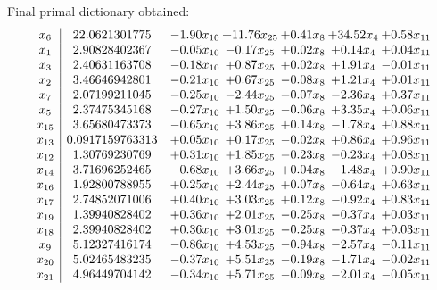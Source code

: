 \documentclass[8pt]{article}
\begin{document}
 Final primal dictionary obtained: 
\[\begin{array}{c| c c@{\hskip 2pt} c@{\hskip 2pt} c@{\hskip 2pt} c@{\hskip 2pt} c@{\hskip 2pt} }
 x_{6}   &  22.0621301775 & -1.90 x_{10} & + 11.76 x_{25} & +  0.41 x_{8} & + 34.52 x_{4} & +  0.58 x_{11}\\
 x_{1}   &  2.90828402367 & -0.05 x_{10} & -0.17 x_{25} & +  0.02 x_{8} & +  0.14 x_{4} & +  0.04 x_{11}\\
 x_{3}   &  2.40631163708 & -0.18 x_{10} & +  0.87 x_{25} & +  0.02 x_{8} & +  1.91 x_{4} & -0.01 x_{11}\\
 x_{2}   &  3.46646942801 & -0.21 x_{10} & +  0.67 x_{25} & -0.08 x_{8} & +  1.21 x_{4} & +  0.01 x_{11}\\
 x_{7}   &  2.07199211045 & -0.25 x_{10} & -2.44 x_{25} & -0.07 x_{8} & -2.36 x_{4} & +  0.37 x_{11}\\
 x_{5}   &  2.37475345168 & -0.27 x_{10} & +  1.50 x_{25} & -0.06 x_{8} & +  3.35 x_{4} & +  0.06 x_{11}\\
 x_{15}   &  3.65680473373 & -0.65 x_{10} & +  3.86 x_{25} & +  0.14 x_{8} & -1.78 x_{4} & +  0.88 x_{11}\\
 x_{13}   &  0.0917159763313 & +  0.05 x_{10} & +  0.17 x_{25} & -0.02 x_{8} & +  0.86 x_{4} & +  0.96 x_{11}\\
 x_{12}   &  1.30769230769 & +  0.31 x_{10} & +  1.85 x_{25} & -0.23 x_{8} & -0.23 x_{4} & +  0.08 x_{11}\\
 x_{14}   &  3.71696252465 & -0.68 x_{10} & +  3.66 x_{25} & +  0.04 x_{8} & -1.48 x_{4} & +  0.90 x_{11}\\
 x_{16}   &  1.92800788955 & +  0.25 x_{10} & +  2.44 x_{25} & +  0.07 x_{8} & -0.64 x_{4} & +  0.63 x_{11}\\
 x_{17}   &  2.74852071006 & +  0.40 x_{10} & +  3.03 x_{25} & +  0.12 x_{8} & -0.92 x_{4} & +  0.83 x_{11}\\
 x_{19}   &  1.39940828402 & +  0.36 x_{10} & +  2.01 x_{25} & -0.25 x_{8} & -0.37 x_{4} & +  0.03 x_{11}\\
 x_{18}   &  2.39940828402 & +  0.36 x_{10} & +  3.01 x_{25} & -0.25 x_{8} & -0.37 x_{4} & +  0.03 x_{11}\\
 x_{9}   &  5.12327416174 & -0.86 x_{10} & +  4.53 x_{25} & -0.94 x_{8} & -2.57 x_{4} & -0.11 x_{11}\\
 x_{20}   &  5.02465483235 & -0.37 x_{10} & +  5.51 x_{25} & -0.19 x_{8} & -1.71 x_{4} & -0.02 x_{11}\\
 x_{21}   &  4.96449704142 & -0.34 x_{10} & +  5.71 x_{25} & -0.09 x_{8} & -2.01 x_{4} & -0.05 x_{11}\\

\end{array}\]
\end{document}
